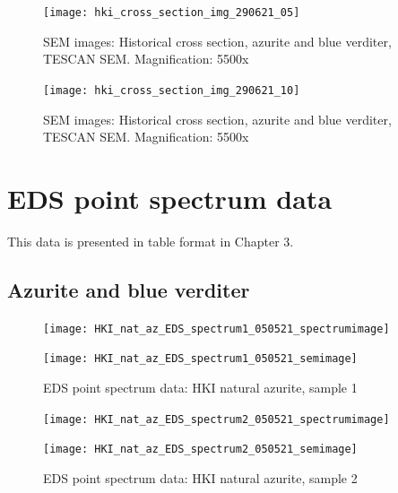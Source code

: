 \begin{figure}[H]
\centering
  \texttt{[image: hki\_cross\_section\_img\_290621\_05]}
\caption[SEM images: Historical cross section, azurite and blue verditer]{SEM images: Historical cross section, azurite and blue verditer, TESCAN SEM. Magnification: 5500x}
\label{fig:xsection_dept_7}
\end{figure}

\begin{figure}[H]
\centering
  \texttt{[image: hki\_cross\_section\_img\_290621\_10]}
\caption[SEM images: Historical cross section, azurite and blue verditer]{SEM images: Historical cross section, azurite and blue verditer, TESCAN SEM. Magnification: 5500x}
\label{fig:xsection_dept_8}
\end{figure}



\section{EDS point spectrum data}

This data is presented in table format in Chapter 3.

\subsection{Azurite and blue verditer}

\begin{figure}[H]
\centering
\begin{minipage}{.45\textwidth}
  \centering
  \texttt{[image: HKI\_nat\_az\_EDS\_spectrum1\_050521\_spectrumimage]}
\end{minipage}
\begin{minipage}{.45\textwidth}
  \centering
  \texttt{[image: HKI\_nat\_az\_EDS\_spectrum1\_050521\_semimage]}
\end{minipage}
\caption[EDS point spectrum data: HKI natural azurite, sample 1]{EDS point spectrum data: HKI natural azurite, sample 1}
\label{fig:hki_point_eds_1}
\end{figure}

\begin{figure}[H]
\centering
\begin{minipage}{.45\textwidth}
  \centering
  \texttt{[image: HKI\_nat\_az\_EDS\_spectrum2\_050521\_spectrumimage]}
\end{minipage}
\begin{minipage}{.45\textwidth}
  \centering
  \texttt{[image: HKI\_nat\_az\_EDS\_spectrum2\_050521\_semimage]}
\end{minipage}
\caption[EDS point spectrum data: HKI natural azurite, sample 2]{EDS point spectrum data: HKI natural azurite, sample 2}
\label{fig:hki_point_eds_2}
\end{figure}


